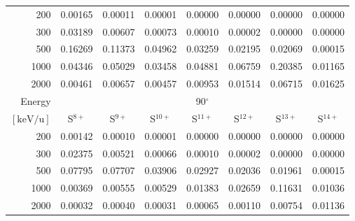\begin{table}[ht]
\begin{tabular}{r|c|c|c|c|c|c|c}
    200   & 0.00165 & 0.00011 & 0.00001 & 0.00000 & 0.00000 & 0.00000 & 0.00000 \\
    300   & 0.03189 & 0.00607 & 0.00073 & 0.00010 & 0.00002 & 0.00000 & 0.00000 \\
    500   & 0.16269 & 0.11373 & 0.04962 & 0.03259 & 0.02195 & 0.02069 & 0.00015 \\
    1000  & 0.04346 & 0.05029 & 0.03458 & 0.04881 & 0.06759 & 0.20385 & 0.01165 \\
    2000  & 0.00461 & 0.00657 & 0.00457 & 0.00953 & 0.01514 & 0.06715 & 0.01625 \\ \cline{1-8}
    Energy & \multicolumn{7}{c}{90$^\circ$} \\ \cline{2-8}
    $\mathrm{[keV/u]}$ & S$^{8+}$ & S$^{9+}$ & S$^{10+}$ & S$^{11+}$ & S$^{12+}$ & S$^{13+}$ & S$^{14+}$ \\ \cline{1-8}
    200   & 0.00142 & 0.00010 & 0.00001 & 0.00000 & 0.00000 & 0.00000 & 0.00000 \\
    300   & 0.02375 & 0.00521 & 0.00066 & 0.00010 & 0.00002 & 0.00000 & 0.00000 \\
    500   & 0.07795 & 0.07707 & 0.03906 & 0.02927 & 0.02036 & 0.01961 & 0.00015 \\
    1000  & 0.00369 & 0.00555 & 0.00529 & 0.01383 & 0.02659 & 0.11631 & 0.01036 \\
    2000  & 0.00032 & 0.00040 & 0.00031 & 0.00065 & 0.00110 & 0.00754 & 0.01136 \\ \cline{1-8}
    \end{tabular}
    \label{tab:XRayEffOCX1}
\end{table}


